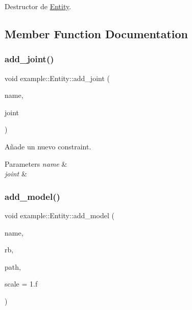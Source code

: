 Destructor de \mbox{\hyperlink{classexample_1_1_entity}{Entity}}. 



\subsection{Member Function Documentation}
\mbox{\label{classexample_1_1_entity_a689cfcb3f6a4e30d2bdab97d94a4e3fd}} 
\subsubsection{\texorpdfstring{add\_joint()}{add\_joint()}}
{\footnotesize\ttfamily void example\+::\+Entity\+::add\+\_\+joint (\begin{DoxyParamCaption}\item[{const std\+::string \&}]{name,  }\item[{std\+::shared\+\_\+ptr$<$ bt\+Hinge\+Constraint $>$ \&}]{joint }\end{DoxyParamCaption})}



Añade un nuevo constraint. 


\begin{DoxyParams}{Parameters}
{\em name} & \\
\hline
{\em joint} & \\
\hline
\end{DoxyParams}
\mbox{\label{classexample_1_1_entity_a223feca4d40f767273389a9afb971149}} 
\subsubsection{\texorpdfstring{add\_model()}{add\_model()}}
{\footnotesize\ttfamily void example\+::\+Entity\+::add\+\_\+model (\begin{DoxyParamCaption}\item[{const std\+::string \&}]{name,  }\item[{std\+::shared\+\_\+ptr$<$ \mbox{\hyperlink{classexample_1_1_rigidbody}{Rigidbody}} $>$ \&}]{rb,  }\item[{const std\+::string \&}]{path,  }\item[{float}]{scale = {\ttfamily 1.f} }\end{DoxyParamCaption})}



